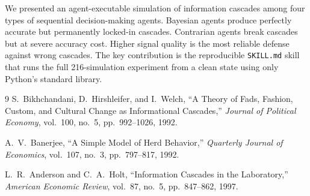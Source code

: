 \documentclass[11pt]{article}
\begin{document}
We presented an agent-executable simulation of information cascades among four types of sequential decision-making agents.
Bayesian agents produce perfectly accurate but permanently locked-in cascades.
Contrarian agents break cascades but at severe accuracy cost.
Higher signal quality is the most reliable defense against wrong cascades.
The key contribution is the reproducible \texttt{SKILL.md} skill that runs the full 216-simulation experiment from a clean state using only Python's standard library.

\begin{thebibliography}{9}
S.~Bikhchandani, D.~Hirshleifer, and I.~Welch,
``A Theory of Fads, Fashion, Custom, and Cultural Change as Informational Cascades,''
\emph{Journal of Political Economy}, vol.~100, no.~5, pp.~992--1026, 1992.

A.~V.~Banerjee,
``A Simple Model of Herd Behavior,''
\emph{Quarterly Journal of Economics}, vol.~107, no.~3, pp.~797--817, 1992.

L.~R.~Anderson and C.~A.~Holt,
``Information Cascades in the Laboratory,''
\emph{American Economic Review}, vol.~87, no.~5, pp.~847--862, 1997.
\end{thebibliography}
\end{document}
